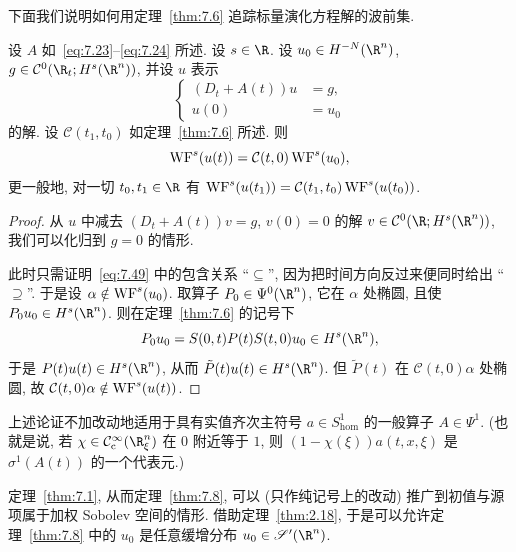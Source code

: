 下面我们说明如何用定理~\ref{thm:7.6} 追踪标量演化方程解的波前集.

\begin{theorem}\label{thm:7.8}
设 $A$ 如~\eqref{eq:7.23}--\eqref{eq:7.24} 所述. 设 $s \in \R$. 设 $u_0 \in H^{-N}(\R^n)$, $g \in \mathcal{C}^0(\R_t; H^s(\R^n))$, 并设 $u$ 表示
\begin{equation}\label{eq:7.48}
    \left\{
    \begin{aligned}
        (D_t + A(t)) u &= g, \\
        u(0) &= u_0
    \end{aligned}
    \right.
\end{equation}
的解. 设 $\mathcal{C}(t_1, t_0)$ 如定理~\ref{thm:7.6} 所述. 则
\begin{equation}\label{eq:7.49}
    \operatorname{WF}^s(u(t)) = \mathcal{C}(t, 0)\operatorname{WF}^s(u_0),
\end{equation}
更一般地, 对一切 $t_0, t_1 \in \R$ 有 $\operatorname{WF}^s(u(t_1)) = \mathcal{C}(t_1, t_0)\operatorname{WF}^s(u(t_0))$.
\end{theorem}

\begin{proof}
从 $u$ 中减去 $(D_t + A(t))v = g$, $v(0) = 0$ 的解 $v \in \mathcal{C}^0(\R; H^s(\R^n))$, 我们可以化归到 $g = 0$ 的情形.

此时只需证明~\eqref{eq:7.49} 中的包含关系 ``$\subseteq$'', 因为把时间方向反过来便同时给出 ``$\supseteq$''. 于是设 $\alpha \notin \operatorname{WF}^s(u_0)$. 取算子 $P_0 \in \Psi^0(\R^n)$, 它在 $\alpha$ 处椭圆, 且使 $P_0 u_0 \in H^s(\R^n)$. 则在定理~\ref{thm:7.6} 的记号下
\begin{equation}\label{eq:7.50}
    P_0 u_0 = S(0, t)P(t)S(t, 0)u_0 \in H^s(\R^n),
\end{equation}
于是 $P(t)u(t) \in H^s(\R^n)$, 从而 $\tilde{P}(t)u(t) \in H^s(\R^n)$. 但 $\tilde{P}(t)$ 在 $\mathcal{C}(t, 0)\alpha$ 处椭圆, 故 $\mathcal{C}(t, 0)\alpha \notin \operatorname{WF}^s(u(t))$.
\end{proof}

\begin{remark}[齐次主符号]\label{rem:7.9}
上述论证不加改动地适用于具有实值齐次主符号 $a \in S^1_{\mathrm{hom}}$ 的一般算子 $A \in \Psi^1$. (也就是说, 若 $\chi \in \SmoothComp(\R^n_\xi)$ 在 $0$ 附近等于 $1$, 则 $(1 - \chi(\xi))a(t, x, \xi)$ 是 $\sigma^1(A(t))$ 的一个代表元.)
\end{remark}

\begin{remark}\label{rem:7.10}
定理~\ref{thm:7.1}, 从而定理~\ref{thm:7.8}, 可以 (只作纯记号上的改动) 推广到初值与源项属于加权 Sobolev 空间的情形. 借助定理~\ref{thm:2.18}, 于是可以允许定理~\ref{thm:7.8} 中的 $u_0$ 是任意缓增分布 $u_0 \in \Schwartz'(\R^n)$.
\end{remark}

